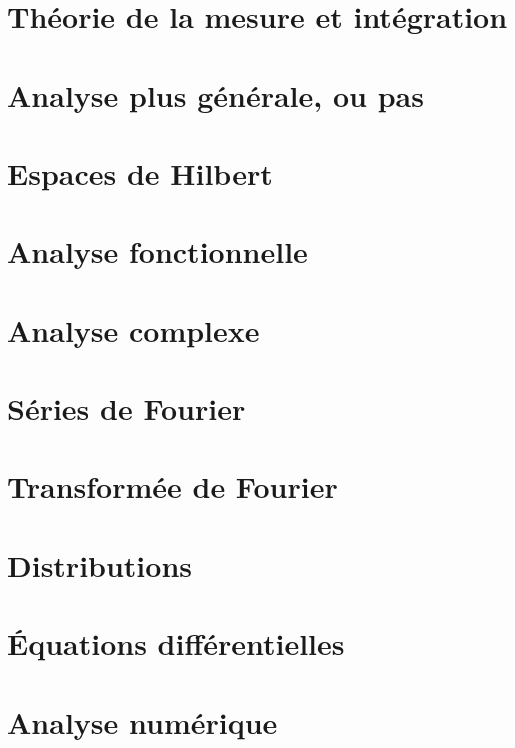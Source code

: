 \chapter{Théorie de la mesure et intégration}





\chapter{Analyse plus générale, ou pas}




\chapter{Espaces de Hilbert}


\chapter{Analyse fonctionnelle}



\chapter{Analyse complexe}



\chapter{Séries de Fourier}


\chapter{Transformée de Fourier}


\chapter{Distributions}


\chapter{Équations différentielles}


\chapter{Analyse numérique}


